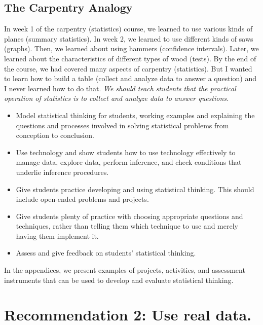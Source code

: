 \documentclass[twoside,openany]{tufte-book}
\begin{document}
\subsection{\textbf{The Carpentry Analogy}}
In week 1 of the carpentry (statistics) course, we learned to use various kinds of planes (summary statistics). In week 2, we learned to use different kinds of saws (graphs). Then, we learned about using hammers (confidence intervals). Later, we learned about the characteristics of different types of wood (tests). By the end of the course, we had covered many aspects of carpentry (statistics). But I wanted to learn how to build a table (collect and analyze data to answer a question) and I never learned how to do that. \textit{We should teach students that the practical operation of statistics is to collect and analyze data to answer questions.}

\vspace{.2in}
\noindent {}

\renewcommand\labelitemi{$\checkmark$}

\begin{itemize}[leftmargin=1cm, itemsep=.2em]
\item Model statistical thinking for students, working examples and explaining the questions and processes involved in solving statistical problems from conception to conclusion.
\item Use technology and show students how to use technology effectively to manage data, explore data, perform inference, and check conditions that underlie inference procedures.
\item Give students practice developing and using statistical thinking.  This should include open-ended problems and projects.
\item Give students plenty of practice with choosing appropriate questions and techniques, rather than telling them which technique to use and merely having them implement it.
\item Assess and give feedback on students' statistical thinking.
\end{itemize}
 
In the appendices, we present examples of projects, activities, and assessment instruments that can be used to develop and evaluate statistical thinking.

\section{\textbf{Recommendation 2: Use real data.}}
 
\end{document}
